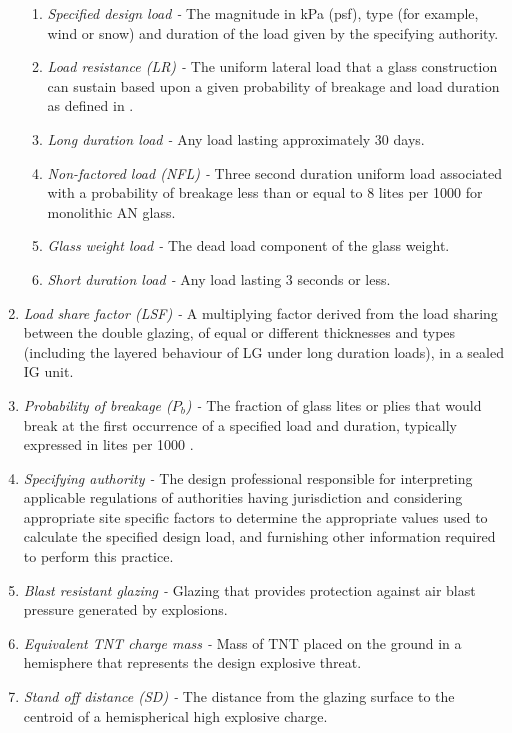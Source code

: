 \documentclass[12pt]{article}
\begin{document}
\begin{enumerate}
\begin{enumerate}
\item \textit{Specified design load -} The magnitude in kPa (psf), type (for 
example, wind or snow) and duration of the load given by the specifying 
authority.
\item \textit{Load resistance (LR) -} The uniform lateral load that a glass 
construction can sustain based upon a given probability of breakage and load 
duration as defined in \cite{ASTM2009}.
\item \textit{Long duration load -} Any load lasting approximately 30 days. 
\item \textit{Non-factored load (NFL) -} Three second duration uniform load 
associated with a probability of breakage less than or equal to 8 lites per 1000 
for monolithic AN glass.
\item \textit{Glass weight load -} The dead load component of the glass weight. 
\item \textit{Short duration load -} Any load lasting 3 seconds or less.
\end{enumerate}
\item \textit{Load share factor (LSF) -} A multiplying factor derived from the 
load sharing between the double glazing, of equal or different thicknesses and 
types (including the layered behaviour of LG under long duration loads), in a 
sealed IG unit.

\item \textit{Probability of breakage ($P_b$) -} The fraction of glass lites or 
plies that would break at the first occurrence of a specified load and duration, 
typically expressed in lites per 1000 \cite{ASTM2016}.

\item \textit{Specifying authority -} The design professional responsible for 
interpreting applicable regulations of authorities having jurisdiction and 
considering appropriate site specific factors to determine the appropriate 
values used to calculate the specified design load, and furnishing other 
information required to perform this practice.

\item \textit{Blast resistant glazing -} Glazing that provides protection 
against air blast pressure generated by explosions. 
\item \textit{Equivalent TNT charge mass -} Mass of TNT placed on the ground in 
a hemisphere that represents the design explosive threat.

\item \textit{Stand off distance (SD) -} The distance from the glazing surface to the 
centroid of a hemispherical high explosive charge.
\end{enumerate}
\end{document}
